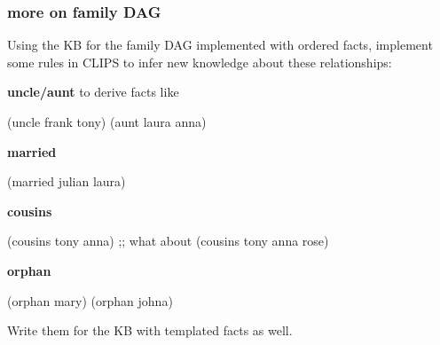 \documentclass[xcolor={usenames,dvipsnames,svgnames}, compress]{beamer}
\begin{document}
\begin{frame}[fragile]
  \frametitle{more on family DAG}

  Using the KB for the family DAG implemented with ordered facts,
  implement some rules in CLIPS to infer new knowledge about these
  relationships:\par\bigskip
  \textbf{uncle/aunt} to derive facts like
    \begin{clips-code}[numbers=none]
      (uncle frank tony) (aunt laura anna)
    \end{clips-code}
  \textbf{married}
    \begin{clips-code}[numbers=none]
      (married julian laura)
    \end{clips-code}
  \textbf{cousins}
    \begin{clips-code}[numbers=none]
      (cousins tony anna)
      ;; what about (cousins tony anna rose)
    \end{clips-code}
  \textbf{orphan}
    \begin{clips-code}[numbers=none]
      (orphan mary)    (orphan johna)
    \end{clips-code}
 \bigskip

 Write them for the KB with templated facts as well.   
\end{frame}
\end{document}
